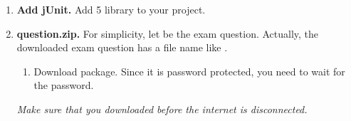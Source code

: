 \begin{enumerate}[label=\roman*.]
\begin{enumerate}[itemsep=1pt, topsep=1pt]
		\item Select .
	
		\item Set Project name as your name or , where xxx is your student no.
	
		\item Make sure that  file is not selected. 
		
	\end{enumerate}
	
		
	Hence, there is nothing under  at the beginning. 
	This becomes important when you zip
	 for submission at the end of the exam.
	
	\item \textbf{Add jUnit.} 
	Add  5 library to your project.
	
	\item \textbf{question.zip.}
	For simplicity, let  be the exam question. 
	Actually, the downloaded exam question has a file name 
	like .
	\begin{enumerate}[itemsep=1pt, topsep=1pt] 
		
		\item Download  package. 
		Since it is password protected, 
		you need to wait for the password.
		
	\end{enumerate}
	
	\emph{
		Make sure that you downloaded  
		before the internet is disconnected.
	}

\end{enumerate}
